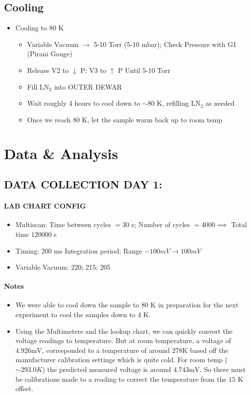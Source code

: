 \documentclass{article}
\begin{document}
\subsection{Cooling}
\begin{itemize}
    \item Cooling to 80 K
    \begin{itemize}
        \item Variable Vacuum $\to$ 5-10 Torr (5-10 mbar); Check Pressure with G1 (Pirani Gauge)
        \item Release V2 to $\downarrow$ P; V3 to $\uparrow$ P Until 5-10 Torr
        \item Fill LN$_2$ into OUTER DEWAR
        \item Wait roughly 4 hours to cool down to $\sim 80$ K, refilling LN$_2$ as needed
        \item Once we reach 80 K, let the sample warm back up to room temp
    \end{itemize}

\end{itemize}



\section{Data \& Analysis}
\subsection{DATA COLLECTION DAY 1:}

\paragraph{LAB CHART CONFIG}
\begin{itemize}
    \item Multiscan: Time between cycles $= 30$ s; Number of cycles $= 4000 \implies$ Total time $120000$ s
    \item Timing: 200 ms Integration period; Range $-100mV \to 100mV$ 
    \item Variable Vacuum: 220; 215; 205
\end{itemize}

\paragraph{Notes}
\begin{itemize}
    \item We were able to cool down the sample to 80 K in preparation for the next 
    experiment to cool the samples down to 4 K.
    \item Using the Multimeters and the lookup chart, we can quickly convert the voltage readings to temperature. But at room temperature,
    a voltage of $4.926\text{mV}$, corresponded to a temperature of around $278\text{K}$ based off the manufacturer calibration settings which is quite cold.
    For room temp ($\sim 293.0K$) the predicted measured voltage is around $4.743\text{mV}$. So there must be calibrations
    made to a reading to correct the temperature from the $15$ K offset.
\end{itemize}
\end{document}
